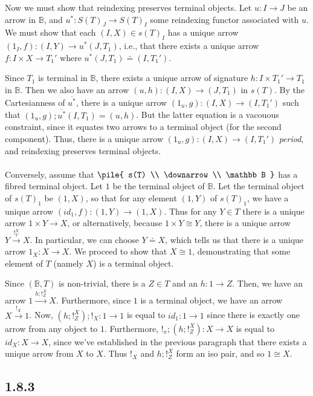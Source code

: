 \documentclass{article}
\newcommand{\vrt}[2]{
\pile{
#1 \\
\downarrow \\
#2
}
}
\begin{document}
Now we must show that reindexing preserves terminal objects. Let $u : I \to J$ be an arrow in $\mathbb B$,
and $u^* : S(T)_J \to S(T)_I$ some reindexing functor associated with $u$. We must show that each
$(I,X) \in s(T)_I$ has a unique arrow $(1_I,f) : (I,Y) \to u^*(J,T_1)$, i.e., that there exists a unique
arrow $f : I \times X \to T_1'$ where $u^*(J,T_1) \doteq (I,T_1')$.

Since $T_1$ is terminal in $\mathbb B$, there exists a unique arrow of signature $h : I \times T_1' \to T_1$ in $\mathbb B$.
Then we also have an arrow $(u,h) : (I, X) \to (J,T_1)$ in $s(T)$. By the Cartesianness of $\overline{u^*}$, there
is a unique arrow $(1_u,g) : (I,X) \to (I,T_1')$ such that $(1_u,g);\overline{u^*}(I,T_1) = (u,h)$. But the latter
equation is a vacouous constraint, since it equates two arrows to a terminal object (for the second component).
Thus, there is a unique arrow $(1_u,g) : (I,X) \to (I,T_1')$ \emph{period}, and reindexing preserves terminal objects.
\\~\\
Conversely, assume that $\vrt{s(T)}{\mathbb B}$ has a fibred terminal object. 
Let $1$ be the terminal object of $\mathbb B$. Let the terminal object of $s(T)_1$ be $(1,X)$, so that 
for any element $(1,Y)$ of $s(T)_1$, we have a unique arrow $(id_1, f) : (1,Y) \to (1,X)$. Thus
for any $Y \in T$ there is a unique arrow $1 \times Y \to X$, or alternatively, because $1 \times Y \cong Y$,
there is a unique arrow $Y \overset{!^{X}_Y}{\longrightarrow} X$. In particular, we can choose $Y \doteq X$, which tells us that there is a
unique arrow $1_X : X \to X$. We proceed to show that $X \cong 1$, demonstrating that some element of $T$ (namely $X$)
is a terminal object.

Since $(\mathbb B, T)$ is non-trivial, there is a $Z \in T$ and an $h : 1 \to Z$. Then, we have an arrow $1 \overset{h;!_Z^{X}}{\longrightarrow} X$.
Furthermore, since $1$ is a terminal object, we have an arrow $X \overset{!_X}{\longrightarrow} 1$.
Now, $(h;!_Z^X);!_X : 1 \to 1$ is equal to $id_1 : 1 \to 1$ since there is exactly one arrow from any object to $1$.
Furthermore, $!_x;(h;!_Z^X) : X \to X$ is equal to $id_X : X \to X$, since we've established in the previous paragraph
that there exists a unique arrow from $X$ to $X$. Thus $!_X$ and $h;!_Z^X$ form an iso pair, and so $1 \cong X$.

\subsection*{1.8.3}
\end{document}
